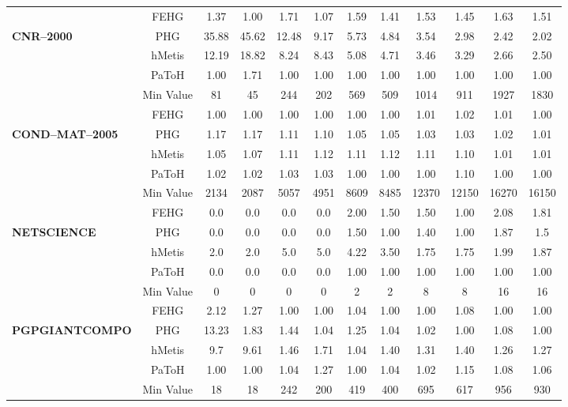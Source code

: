 \documentclass[twocolumn]{svjour3}          \smartqed
\begin{document}
\begin{table*}[hp]
{\begin{threeparttable}
\begin{tabular}{|l|c|cc|cc|cc|cc|cc|}
& FEHG			& 1.37	& 1.00	& 1.71	& 1.07	& 1.59	& 1.41	& 1.53	& 1.45	& 1.63	& 1.51 \\
\textbf{ CNR--2000}
			& PHG			& 35.88	& 45.62	& 12.48	& 9.17	& 5.73	& 4.84	& 3.54	& 2.98	& 2.42	& 2.02 \\
			& hMetis			& 12.19	& 18.82	& 8.24	& 8.43	& 5.08	& 4.71	& 3.46	& 3.29	& 2.66	& 2.50 \\
			& PaToH			& 1.00	& 1.71	& 1.00	& 1.00	& 1.00	& 1.00	& 1.00	& 1.00	& 1.00	& 1.00 \\
			\cline{2-12}
			& Min Value 	& 81		& 45		& 244	& 202	& 569	& 509	& 1014	& 911	& 1927& 1830\\
			\hline

& FEHG			& 1.00	& 1.00	& 1.00	& 1.00	& 1.00	& 1.00	& 1.01	& 1.02	& 1.01	& 1.00 \\
\textbf{ COND--MAT--2005}
			& PHG			& 1.17	& 1.17	& 1.11	& 1.10	& 1.05	& 1.05	& 1.03	& 1.03	& 1.02	& 1.01 \\
			& hMetis			& 1.05	& 1.07	& 1.11	& 1.12	& 1.11	& 1.12	& 1.11	& 1.10	& 1.01	& 1.01 \\
			& PaToH			& 1.02	& 1.02	& 1.03	& 1.03	& 1.00	& 1.00	& 1.00	& 1.10	& 1.00	& 1.00 \\
			\cline{2-12}
			& Min Value		& 2134	& 2087	& 5057	& 4951	& 8609	& 8485	& 12370	& 12150	& 16270 & 16150 \\
			\hline

& FEHG			& 0.0	& 0.0	& 0.0	& 0.0	& 2.00	& 1.50	& 1.50	& 1.00	& 2.08	& 1.81 \\
\textbf{ NETSCIENCE\tnote{\textasteriskcentered}}
			& PHG			& 0.0	& 0.0	& 0.0	& 0.0	& 1.50	& 1.00	& 1.40	& 1.00	& 1.87	& 1.5 \\
			& hMetis			& 2.0	& 2.0	& 5.0	& 5.0	& 4.22	& 3.50	& 1.75	& 1.75	& 1.99	& 1.87 \\
			& PaToH			& 0.0	& 0.0	& 0.0	& 0.0	& 1.00	& 1.00	& 1.00	& 1.00	& 1.00	& 1.00 \\
			\cline{2-12}
			& Min Value 	& 0	& 0		& 0		& 0		& 2		& 2		& 8	& 8	& 16		& 16	 \\
			\hline

& FEHG			& 2.12	& 1.27	& 1.00	& 1.00	& 1.04	& 1.00	& 1.00	& 1.08	& 1.00	& 1.00 \\
\textbf{ PGPGIANTCOMPO}
			& PHG			& 13.23	& 1.83	& 1.44	& 1.04	& 1.25	& 1.04	& 1.02	& 1.00	& 1.08	& 1.00	 \\
			& hMetis			& 9.7	& 9.61	& 1.46	& 1.71	& 1.04	& 1.40	& 1.31	& 1.40	& 1.26	& 1.27 \\
			& PaToH			& 1.00	& 1.00	& 1.04	& 1.27	& 1.00	& 1.04	& 1.02	& 1.15	& 1.08	& 1.06 \\
			\cline{2-12}
			& Min Value 	& 18		& 18		& 242	& 200	& 419	& 400	& 695	& 617	& 956	& 930 \\
			\hline


\end{tabular}
\end{threeparttable}}
\end{table*}
\end{document}
